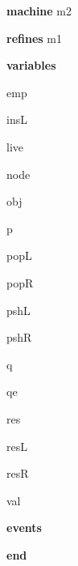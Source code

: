 \begin{block}
  \item   \textbf{machine} m2
  \item   \textbf{refines} m1
  \item   \textbf{variables}
  \begin{block}
    \item   emp
    \item   insL
    \item   live
    \item   node
    \item   obj
    \item   p
    \item   popL
    \item   popR
    \item   pshL
    \item   pshR
    \item   q
    \item   qe
    \item   res
    \item   resL
    \item   resR
    \item   val
  \end{block}
  \item   
  \item   
  \item   
  \item   \textbf{events}
  \begin{block}
    \item   
    \item   
    \item   
    \item   
  \end{block}
  \item   \textbf{end} \\
\end{block}
